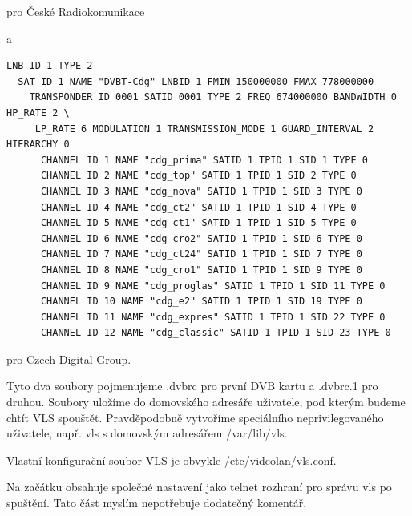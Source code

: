 \vspace{10pt}

pro České Radiokomunikace 

\vspace{10pt}

a

\vspace{10pt}

\begin{small}
\begin{verbatim}
LNB ID 1 TYPE 2
  SAT ID 1 NAME "DVBT-Cdg" LNBID 1 FMIN 150000000 FMAX 778000000
    TRANSPONDER ID 0001 SATID 0001 TYPE 2 FREQ 674000000 BANDWIDTH 0 HP_RATE 2 \
     LP_RATE 6 MODULATION 1 TRANSMISSION_MODE 1 GUARD_INTERVAL 2 HIERARCHY 0
      CHANNEL ID 1 NAME "cdg_prima" SATID 1 TPID 1 SID 1 TYPE 0
      CHANNEL ID 2 NAME "cdg_top" SATID 1 TPID 1 SID 2 TYPE 0
      CHANNEL ID 3 NAME "cdg_nova" SATID 1 TPID 1 SID 3 TYPE 0
      CHANNEL ID 4 NAME "cdg_ct2" SATID 1 TPID 1 SID 4 TYPE 0
      CHANNEL ID 5 NAME "cdg_ct1" SATID 1 TPID 1 SID 5 TYPE 0
      CHANNEL ID 6 NAME "cdg_cro2" SATID 1 TPID 1 SID 6 TYPE 0
      CHANNEL ID 7 NAME "cdg_ct24" SATID 1 TPID 1 SID 7 TYPE 0
      CHANNEL ID 8 NAME "cdg_cro1" SATID 1 TPID 1 SID 9 TYPE 0
      CHANNEL ID 9 NAME "cdg_proglas" SATID 1 TPID 1 SID 11 TYPE 0
      CHANNEL ID 10 NAME "cdg_e2" SATID 1 TPID 1 SID 19 TYPE 0
      CHANNEL ID 11 NAME "cdg_expres" SATID 1 TPID 1 SID 22 TYPE 0
      CHANNEL ID 12 NAME "cdg_classic" SATID 1 TPID 1 SID 23 TYPE 0
\end{verbatim}
\end{small}

\vspace{10pt}

pro Czech Digital Group.

\vspace{10pt}

Tyto dva soubory pojmenujeme .dvbrc pro první DVB kartu a .dvbrc.1 pro druhou. Soubory uložíme do domovského adresáře uživatele, pod kterým budeme chtít VLS spouštět. Pravděpodobně vytvoříme speciálního neprivilegovaného uživatele, např. vls s domovským adresářem /var/lib/vls.

\vspace{10pt}

Vlastní konfigurační soubor VLS je obvykle /etc/videolan/vls.conf. 

\vspace{10pt}

Na začátku obsahuje společné nastavení jako telnet rozhraní pro správu vls po spuštění. Tato část myslím nepotřebuje dodatečný komentář.

